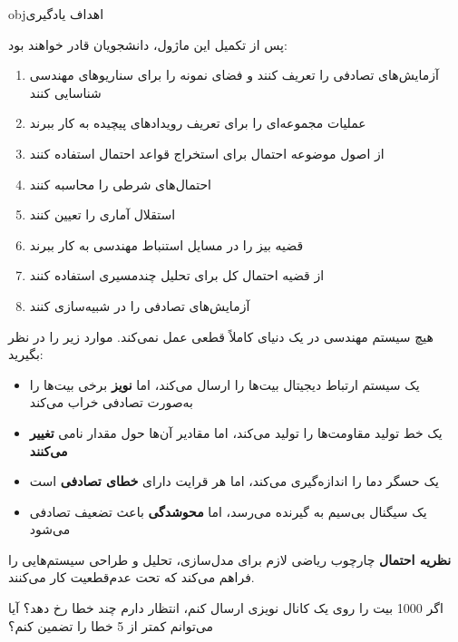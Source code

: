 \begin{PSbox}[unbreakable]{obj}{اهداف یادگیری}

پس از تکمیل این ماژول، دانشجویان قادر خواهند بود:

\begin{enumerate}
\def\labelenumi{\arabic{enumi}.}
\tightlist
\item
  آزمایش‌های تصادفی را تعریف کنند و فضای نمونه را برای سناریوهای مهندسی شناسایی کنند
\item
  عملیات مجموعه‌ای را برای تعریف رویدادهای پیچیده به کار ببرند
\item
  از اصول موضوعه احتمال برای استخراج قواعد احتمال استفاده کنند
\item
  احتمال‌های شرطی را محاسبه کنند
\item
  استقلال آماری را تعیین کنند
\item
  قضیه بیز را در مسایل استنباط مهندسی به کار ببرند
\item
  از قضیه احتمال کل برای تحلیل چندمسیری استفاده کنند
\item
  آزمایش‌های تصادفی را در  شبیه‌سازی کنند
\end{enumerate}

\end{PSbox}



هیچ سیستم مهندسی در یک دنیای کاملاً قطعی عمل نمی‌کند. موارد زیر را در نظر بگیرید:

\begin{itemize}
\tightlist
\item
  یک سیستم ارتباط دیجیتال بیت‌ها را ارسال می‌کند، اما \textbf{نویز} برخی بیت‌ها را به‌صورت تصادفی خراب می‌کند
\item
  یک خط تولید مقاومت‌ها را تولید می‌کند، اما مقادیر آن‌ها حول مقدار نامی \textbf{تغییر می‌کنند}
\item
  یک حسگر دما را اندازه‌گیری می‌کند، اما هر قرایت دارای \textbf{خطای تصادفی} است
\item
  یک سیگنال بی‌سیم به گیرنده می‌رسد، اما \textbf{محو‌شدگی} باعث تضعیف تصادفی می‌شود
\end{itemize}

\textbf{نظریه احتمال} چارچوب ریاضی لازم برای مدل‌سازی، تحلیل و طراحی سیستم‌هایی را فراهم می‌کند که تحت عدم‌قطعیت کار می‌کنند.


\begin{PSquote}

اگر 1000 بیت را روی یک کانال نویزی ارسال کنم، انتظار دارم چند خطا رخ دهد؟ آیا می‌توانم کمتر از 5 خطا را تضمین کنم؟

\end{PSquote}

